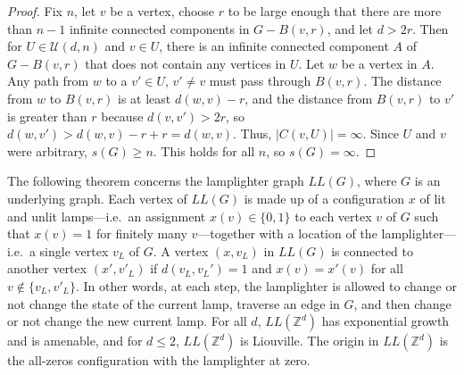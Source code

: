 \documentclass[11pt]{article}
\newcommand{\Z}{\mathbb{Z}}
\newcommand{\U}{\mathcal{U}}
\begin{document}
\begin{proof}
Fix $n$, let $v$ be a vertex, choose $r$ to be large enough that there are more than $n-1$ infinite connected components in $G - B(v,r)$, and let $d>2r$. Then for $U \in \U(d,n)$ and $v \in U$, there is an infinite connected component $A$ of $G-B(v,r)$ that does not contain any vertices in $U$. Let $w$ be a vertex in $A$. Any path from $w$ to a $v' \in U$, $v' \neq v$ must pass through $B(v,r)$. The distance from $w$ to $B(v,r)$ is at least $d(w,v) - r$, and the distance from $B(v,r)$ to $v'$ is greater than $r$ because $d(v,v')>2r$, so $d(w,v') > d(w,v) - r + r = d(w,v)$. Thus, $|C(v,U)| = \infty$. Since $U$ and $v$ were arbitrary, $s(G) \geq n$. This holds for all $n$, so $s(G) = \infty$.
\end{proof}

The following theorem concerns the lamplighter graph $LL(G)$, where $G$ is an underlying graph. Each vertex of $LL(G)$ is made up of a configuration $x$ of lit and unlit lamps---i.e.\ an assignment $x(v) \in \{0,1\}$ to each vertex $v$ of $G$ such that $x(v) = 1$ for finitely many $v$---together with a location of the lamplighter---i.e.\ a single vertex $v_L$ of $G$. A vertex $(x,v_L)$ in $LL(G)$ is connected to another vertex $(x', v'_L)$ if $d(v_L, v_L') = 1$ and $x(v) = x'(v)$ for all $v \notin \{v_L, v'_L\}$. In other words, at each step, the lamplighter is allowed to change or not change the state of the current lamp, traverse an edge in $G$, and then change or not change the new current lamp. For all $d$, $LL(\Z^d)$ has exponential growth and is amenable, and for $d \leq 2$, $LL(\Z^d)$ is Liouville. The origin in $LL(\Z^d)$ is the all-zeros configuration with the lamplighter at zero.
\end{document}
